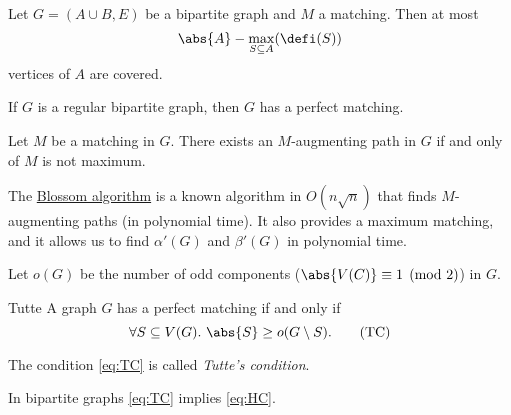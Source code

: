 \begin{theorem}
    Let $G = (A \cup B, E)$ be a bipartite graph and $M$ a matching. Then at 
    most
    \[
        \abs{A} - \max_{S \subseteq A}(\defi(S))
    \]
    vertices of $A$ are covered.
\end{theorem}


\begin{theorem}
    If $G$ is a regular bipartite graph, then $G$ has a perfect matching.
\end{theorem}



\begin{theorem}
    Let $M$ be a matching in $G$. There exists an $M$-augmenting path in $G$ if and only of $M$ is not maximum.
\end{theorem}


The \href{https://en.wikipedia.org/wiki/Blossom_algorithm}{Blossom algorithm} is a known algorithm in $O(n\sqrt{n})$ that finds $M$-augmenting paths
(in polynomial time). It also provides a maximum matching, and it allows us to find $\alpha'(G)$ and $\beta'(G)$ in polynomial time.

Let $o(G)$ be the number of odd components ($\abs{V(C)} \equiv 1 \pmod{2}$) in $G$.

\begin{theorem}{Tutte}
    A graph $G$ has a perfect matching if and only if 
    \begin{equation}
        \forall S\subseteq V(G).~\abs{S}\ge o(G \setminus S). 
        \tag{TC}
        \label{eq:TC}
    \end{equation}
\end{theorem}

The condition \eqref{eq:TC} is called \emph{Tutte's condition}.


\begin{remark}
    In bipartite graphs \eqref{eq:TC} implies \eqref{eq:HC}.
\end{remark}

